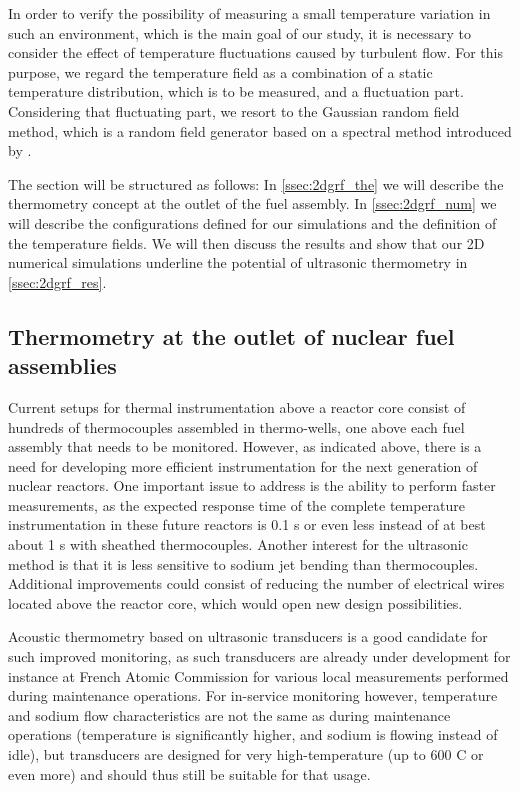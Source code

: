         In order to verify the possibility of measuring a small temperature variation in such an environment, which is the main goal of our study, it is
necessary to consider the effect of temperature fluctuations caused by turbulent flow. For this purpose, we regard the temperature field as a combination of a
static temperature distribution, which is to be measured, and a fluctuation part. Considering that fluctuating part, we resort to the Gaussian random field
method, which is a random field generator based on a spectral method introduced by \textcite{Shinozuka1972Digitalsimulationof}.

        The section will be structured as follows: In \autoref{ssec:2dgrf_the} we will describe the thermometry concept at the outlet of the fuel assembly. In \autoref{ssec:2dgrf_num} we will describe the configurations defined for our simulations and the definition of the temperature fields. We will then discuss the results and show that our 2D numerical simulations underline the potential of ultrasonic thermometry in \autoref{ssec:2dgrf_res}.

    \subsection{Thermometry at the outlet of nuclear fuel assemblies} \label{ssec:2dgrf_the}
        Current setups for thermal instrumentation above a reactor core consist of hundreds of thermocouples assembled in thermo-wells, one above each fuel
assembly that needs to be monitored. However, as indicated above, there is a need for developing more efficient instrumentation for the next generation of
nuclear reactors. One important issue to address is the ability to perform faster measurements, as the expected response time of the complete temperature
instrumentation in these future reactors is 0.1 s or even less instead of at best about 1 s with sheathed thermocouples. Another interest for the ultrasonic
method is that it is less sensitive to sodium jet bending than thermocouples. Additional improvements could consist of reducing the number of electrical wires
located above the reactor core, which would open new design possibilities.

      Acoustic thermometry based on ultrasonic transducers is a good candidate for such improved monitoring, as such transducers are already under development
for instance at French Atomic Commission for various local measurements performed during maintenance operations. For in-service monitoring however, temperature
and sodium flow characteristics are not the same as during maintenance operations (temperature is significantly higher, and sodium is flowing instead of idle),
but transducers are designed for very high-temperature (up to 600 \textdegree{}C or even more) and should thus still be suitable for that usage.

